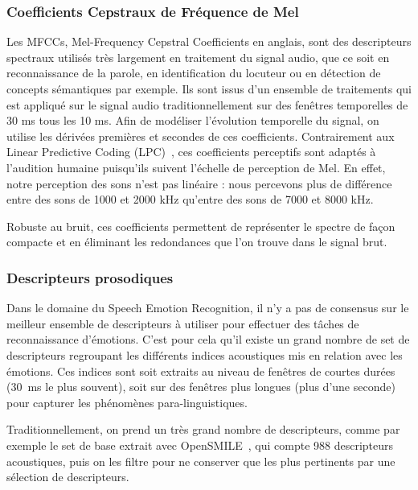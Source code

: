 \subsubsection{Coefficients Cepstraux de Fréquence de Mel}
Les MFCCs, Mel-Frequency Cepstral Coefficients en anglais, sont des descripteurs spectraux utilisés très largement en traitement du signal audio, que ce soit en reconnaissance de la parole, en identification du locuteur ou en détection de concepts sémantiques par exemple. Ils sont issus d'un ensemble de traitements qui est appliqué sur le signal audio traditionnellement sur des fenêtres temporelles de 30 ms tous les 10 ms. Afin de modéliser l'évolution temporelle du signal, on utilise les dérivées premières et secondes de ces coefficients. Contrairement aux Linear Predictive Coding (LPC)~\cite{Rabiner1993},
ces coefficients perceptifs sont adaptés à l'audition humaine puisqu'ils suivent l'échelle de perception de Mel. En effet, notre perception des sons n'est pas linéaire : nous percevons plus de différence entre des sons de 1000 et 2000 kHz qu'entre des sons de 7000 et 8000 kHz.

Robuste au bruit, ces coefficients permettent de représenter le spectre de façon compacte et en éliminant les redondances que l'on trouve dans le signal brut.


\subsubsection{Descripteurs prosodiques}
Dans le domaine du Speech Emotion Recognition, il n’y a pas de consensus sur le meilleur ensemble de descripteurs à utiliser pour effectuer des tâches de reconnaissance d'émotions. C'est pour cela qu'il existe un grand nombre de set de descripteurs regroupant les différents indices acoustiques mis en relation avec les émotions. Ces indices sont soit extraits au niveau de fenêtres de courtes durées (30~ms le plus souvent), soit sur des fenêtres plus longues (plus d'une seconde) pour capturer les phénomènes para-linguistiques.

Traditionnellement, on prend un très grand nombre de descripteurs, comme par exemple le set de base extrait avec OpenSMILE~\cite{OPENSMILE}, qui compte 988 descripteurs acoustiques, puis on les filtre pour ne conserver que les plus pertinents par une sélection de descripteurs.

